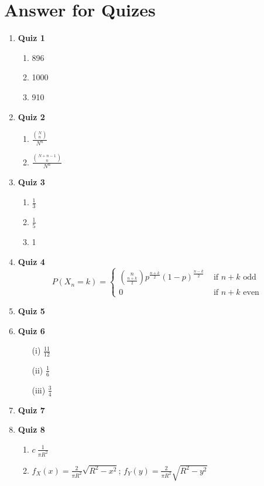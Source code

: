 \documentclass{article}
\begin{document}
\newpage
\appendix


\section{Answer for Quizes}
\begin{enumerate}



\item \textbf{\large Quiz 1}
    \begin{enumerate}
        \item 896
        \item 1000
        \item 910
    \end{enumerate}

\item \textbf{\large Quiz 2}
    \begin{enumerate}
        \item $\frac{\binom{N}{n}}{N^n}$
        \item $\frac{\binom{N+n-1}{n}}{N^n}$
    \end{enumerate}

\item \textbf{\large Quiz 3}
    \begin{enumerate}
        \item $\frac{1}{3}$
        \item $\frac{1}{5}$
        \item 1
    \end{enumerate}

\item \textbf{\large Quiz 4}
    \[
    P(X_n = k) =
    \begin{cases}
        \binom{n}{\frac{n+k}{2}}p^{\frac{n+k}{2}}(1-p)^{\frac{n-k}{2}} & \text{ if } n+k \text{ odd } \\
        0 & \text{ if } n+k \text{ even }
    \end{cases}
    \]


\item \textbf{\large Quiz 5}


\item \textbf{\large Quiz 6}
\begin{enumerate}
    \item[(i)] $\frac{11}{12}$
    \item[(ii)] $\frac{1}{6}$
    \item[(iii)] $\frac{3}{4}$
\end{enumerate}

\item \textbf{\large Quiz 7}


\item \textbf{\large Quiz 8}
\begin{enumerate}
    \item $c \ \frac{1}{\pi R^2}$
    \item $f_X(x) = \frac{2}{\pi R^2}\sqrt{R^2 - x^2}$;  $f_Y(y) = \frac{2}{\pi R^2}\sqrt{R^2 - y^2}$
\end{enumerate}


\end{enumerate}
\end{document}
